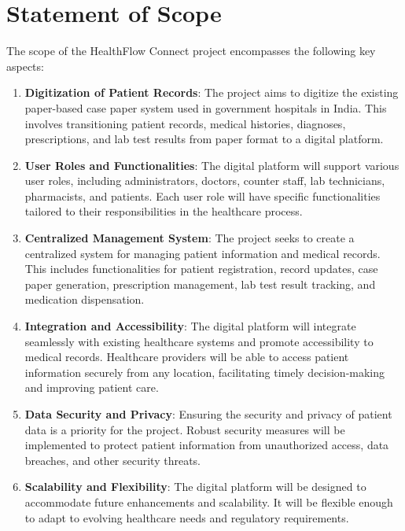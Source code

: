 \section{Statement of Scope}

The scope of the HealthFlow Connect project encompasses the following key aspects:

\begin{enumerate}
    \item \textbf{Digitization of Patient Records}: The project aims to digitize the existing paper-based case paper system used in government hospitals in India. This involves transitioning patient records, medical histories, diagnoses, prescriptions, and lab test results from paper format to a digital platform.
    
    \item \textbf{User Roles and Functionalities}: The digital platform will support various user roles, including administrators, doctors, counter staff, lab technicians, pharmacists, and patients. Each user role will have specific functionalities tailored to their responsibilities in the healthcare process.
    
    \item \textbf{Centralized Management System}: The project seeks to create a centralized system for managing patient information and medical records. This includes functionalities for patient registration, record updates, case paper generation, prescription management, lab test result tracking, and medication dispensation.
    
    \item \textbf{Integration and Accessibility}: The digital platform will integrate seamlessly with existing healthcare systems and promote accessibility to medical records. Healthcare providers will be able to access patient information securely from any location, facilitating timely decision-making and improving patient care.
    
    \item \textbf{Data Security and Privacy}: Ensuring the security and privacy of patient data is a priority for the project. Robust security measures will be implemented to protect patient information from unauthorized access, data breaches, and other security threats.
    
    \item \textbf{Scalability and Flexibility}: The digital platform will be designed to accommodate future enhancements and scalability. It will be flexible enough to adapt to evolving healthcare needs and regulatory requirements.
\end{enumerate}

